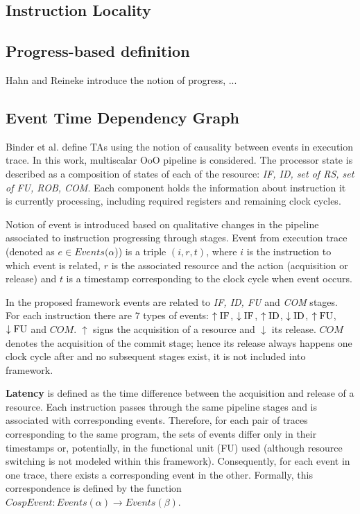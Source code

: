 
\subsection{Instruction Locality}
\subsection{Progress-based definition}

Hahn and Reineke \cite{hahn_design_2020} introduce the notion of progress, ... \cite{gruin_minotaur_2023}

\subsection{Event Time Dependency Graph}

Binder et al. \cite{binder_definitions_2022} define TAs using the notion of causality between events in execution trace. In this work, multiscalar OoO pipeline is considered. The processor state is described as a composition of states of each of the resource: \textit{IF, ID, set of RS, set of FU, ROB, COM}. Each component holds the information about instruction it is currently processing, including required registers and remaining clock cycles.

Notion of event is introduced based on qualitative changes in the pipeline associated to instruction progressing through stages. Event from execution trace (denoted as $e \in Events(\alpha$)) is a triple $(i,r,t)$, where $i$ is the instruction to which event is related, $r$ is the associated resource and the action (acquisition or release) and $t$ is a timestamp corresponding to the clock cycle when event occurs.

In the proposed framework events are related to \textit{IF, ID, FU} and \textit{COM} stages. For each instruction there are 7 types of events: $\uparrow\mathrm{IF}$, $\downarrow\mathrm{IF}$, $\uparrow\mathrm{ID}$, $\downarrow\mathrm{ID}$, $\uparrow\mathrm{FU}$, $\downarrow\mathrm{FU}$ and $COM$. $\uparrow$ signs the acquisition of a resource and $\downarrow$ its release. $COM$ denotes the acquisition of the commit stage; hence its release always happens one clock cycle after and no subsequent stages exist, it is not included into framework.

\textbf{Latency} is defined as the time difference between the acquisition and release of a resource. Each instruction passes through the same pipeline stages and is associated with corresponding events. Therefore, for each pair of traces corresponding to the same program, the sets of events differ only in their timestamps or, potentially, in the functional unit (FU) used (although resource switching is not modeled within this framework). Consequently, for each event in one trace, there exists a corresponding event in the other. Formally, this correspondence is defined by the function $CospEvent: Events(\alpha) \rightarrow Events(\beta)$.


